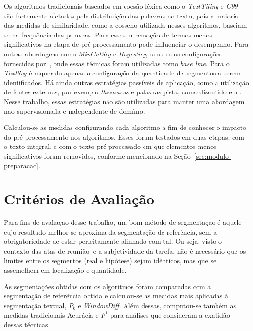 Os algoritmos tradicionais baseados em coesão léxica como o \textit{TextTiling} e \textit{C99} são fortemente afetados pela distribuição das palavras no texto, pois a maioria das medidas de similaridade, como a cosseno utilizada nesses algoritmos, baseiam-se na frequência das palavras. Para esses, a remoção de termos menos significativos na etapa de pré-processamento pode influenciar o desempenho. Para outras abordagens como \textit{MinCutSeg} e \textit{BayesSeg}, usou-se as configurações fornecidas por~\cite{Eis2008}, onde essas técnicas foram utilizadas como \textit{base line}. Para o \textit{TextSeg} é requerido apenas a configuração da quantidade de segmentos a serem identificados.
Há ainda outras estratégias passíveis de aplicação, como a utilização de fontes externas, por exemplo \textit{thesaurus} e palavras pista, como discutido em \cite{Naili2016, Gutierrez2016, Ferret2009}. Nesse trabalho, essas estratégias não são utilizadas para manter uma abordagem não supervisionada e independente de domínio. 

Calculou-se as medidas configurando cada algoritmo
a fim de conhecer o impacto do pré-processamento nos algoritmos. 
Esses foram testados em duas etapas: com o texto integral, e com o texto pré-processado em que elementos menos significativos foram removidos, conforme mencionado na Seção~\ref{sec:modulo-preparacao}.  


\section{Critérios de Avaliação}

Para fins de avaliação desse trabalho, um bom método de segmentação é aquele cujo resultado melhor se aproxima da segmentação de referência, sem a obrigatoriedade de estar perfeitamente alinhado com tal. Ou seja, visto o contexto das atas de reunião, e a subjetividade da tarefa, não é necessário que os limites entre os segmentos (real e hipótese) sejam idênticos, mas que se assemelhem em localização e quantidade.

As segmentações obtidas com os algoritmos foram comparadas com a segmentação de referência obtida e calculou-se as medidas mais aplicadas à segmentação textual, $P_k$ e \textit{WindowDiff}. Além dessas, computou-se também as medidas tradicionais Acurácia e $F^1$ para análises que consideram a exatidão dessas técnicas.
%



